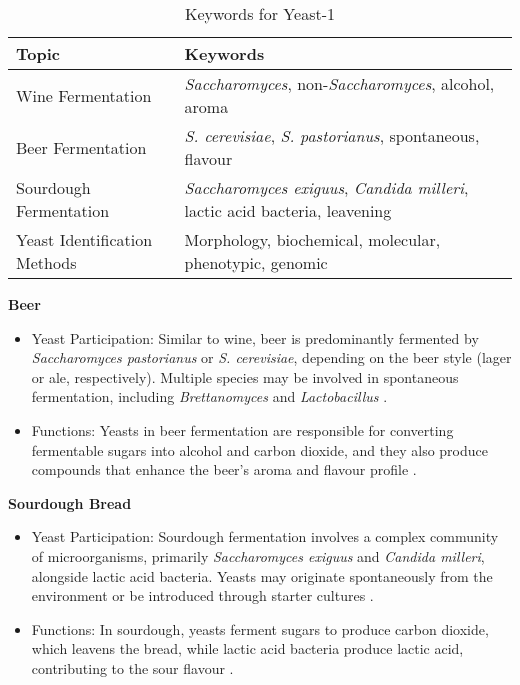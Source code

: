 \begin{table}[h]
    \centering
    \caption{Keywords for Yeast-1} 
    \label{tab:KW-Yeast1}
    \begin{tabular}{l|l}
        \textbf{Topic} & \textbf{Keywords} \\
        \hline
        Wine Fermentation & \textit{Saccharomyces}, non-\textit{Saccharomyces}, alcohol, aroma \\
        Beer Fermentation & \textit{S. cerevisiae}, \textit{S. pastorianus}, spontaneous, flavour \\
        Sourdough Fermentation & \textit{Saccharomyces exiguus}, \textit{Candida milleri}, lactic acid bacteria, leavening \\
        Yeast Identification Methods & Morphology, biochemical, molecular, phenotypic, genomic \\
    \end{tabular}
\end{table}

\vspace*{0.5em}
\textbf{Beer}
\begin{itemize}
    \item Yeast Participation: Similar to wine, beer is predominantly fermented by \textit{Saccharomyces pastorianus} or \textit{S. cerevisiae}, depending on the beer style (lager or ale, respectively). Multiple species may be involved in spontaneous fermentation, including \textit{Brettanomyces} and \textit{Lactobacillus} \cite*{L6-Yeasts, L9-ISAPP}.
    \item Functions: Yeasts in beer fermentation are responsible for converting fermentable sugars into alcohol and carbon dioxide, and they also produce compounds that enhance the beer's aroma and flavour profile \cite*{L6-Yeasts, L9-ISAPP}.
\end{itemize}

\vspace*{0.5em}
\textbf{Sourdough Bread}
\begin{itemize}
    \item Yeast Participation: Sourdough fermentation involves a complex community of microorganisms, primarily \textit{Saccharomyces exiguus} and \textit{Candida milleri}, alongside lactic acid bacteria. Yeasts may originate spontaneously from the environment or be introduced through starter cultures \cite*{L6-Yeasts}.
    \item Functions: In sourdough, yeasts ferment sugars to produce carbon dioxide, which leavens the bread, while lactic acid bacteria produce lactic acid, contributing to the sour flavour .
\end{itemize}

